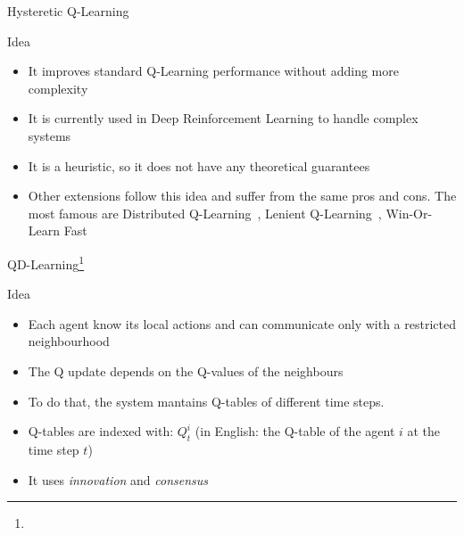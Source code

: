 \documentclass[presentation]{beamer}\mode<presentation>{\usetheme{AMSBolognaFC}}
\begin{document}
\begin{frame}{Hysteretic Q-Learning}
	\begin{exampleblock}{Idea}
		\begin{itemize}{}
			\item[{\color{teal} \faThumbsUp}] It improves standard Q-Learning performance without adding more complexity
			\item[{\color{teal} \faThumbsUp}] It is currently used in Deep Reinforcement Learning to handle complex systems~\parencite{DBLP:conf/icml/OmidshafieiPAHV17}
			\item[{\color{red} \faThumbsDown}] It is a heuristic, so it does not have any theoretical guarantees
			\item Other extensions follow this idea and suffer from the same pros and cons. The most famous are Distributed Q-Learning~\parencite{DBLP:conf/icml/LauerR00}, Lenient Q-Learning~\parencite{DBLP:conf/atal/PanaitSL06}, Win-Or-Learn Fast~\parencite{DBLP:journals/ai/BowlingV02}
		\end{itemize}
	\end{exampleblock}
\end{frame}
\begin{frame}{QD-Learning\footnote[frame]{}}
	\begin{exampleblock}{Idea}
		\begin{itemize}
			\item Each agent know its local actions and can communicate only with a restricted neighbourhood
			\item The Q update depends on the Q-values of the neighbours
			\item To do that, the system mantains Q-tables of different time steps.
			\item Q-tables are indexed with: $Q^i_t$ (in English: the Q-table of the agent $i$ at the time step $t$)
			\item It uses \emph{innovation} and \emph{consensus}
		\end{itemize}		
	\end{exampleblock}
\end{frame}
\end{document}
